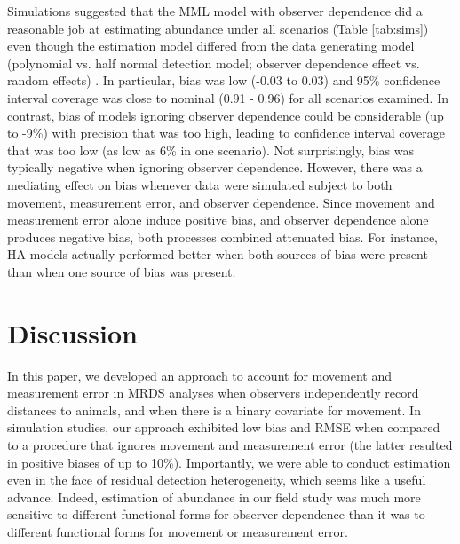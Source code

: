 \documentclass[aoas,preprint]{imsart}
\numberwithin{equation}{section}
\theoremstyle{plain}
\begin{document}
Simulations suggested that the MML model with observer dependence did a reasonable job at estimating abundance under all scenarios (Table \ref{tab:sims}) even though the estimation model differed from the data generating model (polynomial vs. half normal detection model; observer dependence effect vs. random effects) .  In particular, bias was low (-0.03 to 0.03) and 95\% confidence interval coverage was close to nominal (0.91 - 0.96) for all scenarios examined.  In contrast, bias of models ignoring observer dependence could be considerable (up to -9\%) with precision that was too high, leading to confidence interval coverage that was too low (as low as 6\% in one scenario).  Not surprisingly, bias was typically negative when ignoring observer dependence. However, there was a mediating effect on bias whenever data were simulated subject to both movement, measurement error, and observer dependence.  Since movement and measurement error alone induce positive bias, and observer dependence alone produces negative bias, both processes combined attenuated bias. For instance, HA models actually performed better when both sources of bias were present than when one source of bias was present.



\section{Discussion}

In this paper, we developed an approach to account for movement and measurement error in MRDS analyses when observers independently record distances to animals, and when there is a binary covariate for movement. In simulation studies, our approach exhibited low bias and RMSE when compared to a procedure that ignores movement and measurement error (the latter resulted in positive biases of up to 10\%).  Importantly, we were able to conduct estimation even in the face of residual detection heterogeneity, which seems like a useful advance. Indeed, estimation of abundance in our field study was much more sensitive to different functional forms for observer dependence than it was to different functional forms for movement or measurement error.
\end{document}
